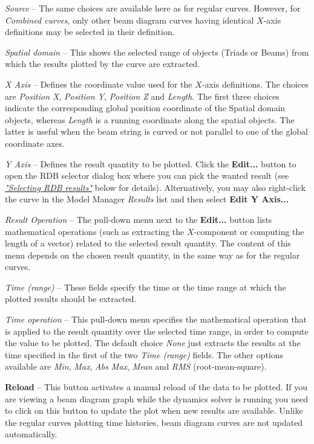 \begin{bulletlist}
\item{\sl Source} --
  The same choices are available here as for regular curves.
  However, for {\sl Combined curves}, only other beam diagram curves having
  identical $X$-axis definitions may be selected in their definition.

\item{\sl Spatial domain} --
  This shows the selected range of objects (Triads or Beams)
  from which the results plotted by the curve are extracted.

\item{\sl X Axis} --
  Defines the coordinate value used for the $X$-axis definitions.
  The choices are {\sl Position X}, {\sl Position Y}, {\sl Position Z} and
  {\sl Length}. The first three choices indicate the corresponding global
  position coordinate of the Spatial domain objects, whereas {\sl Length}
  is a running coordinate along the spatial objects.
  The latter is useful when the beam string is curved or not parallel to
  one of the global coordinate axes.

\item{\sl Y Axis} --
  Defines the result quantity to be plotted.
  Click the \textbf{Edit...} button to open the RDB selector dialog box
  where you can pick the wanted result (see
  \protect\hyperlink{selecting-beam-results}{\sl"Selecting RDB results"}
  below for details). Alternatively, you may also right-click the curve in the
  Model Manager {\sl Results} list and then select \textbf{Edit Y Axis...}

\item{\sl Result Operation} --
  The pull-down menu next to the \textbf{Edit...} button lists mathematical
  operations (such as extracting the $X$-component or computing the length of a
  vector) related to the selected result quantity. The content of this menu
  depends on the chosen result quantity, in the same way as for the regular
  curves.

\item{\sl Time (range)} --
  These fields specify the time or the time range at which the plotted results
  should be extracted.

\item{\sl Time operation} --
  This pull-down menu specifies the mathematical operation that is applied to
  the result quantity over the selected time range, in order to compute the
  value to be plotted. The default choice {\sl None} just extracts the results
  at the time specified in the first of the two {\sl Time (range)} fields.
  The other options available are {\sl Min}, {\sl Max}, {\sl Abs Max},
  {\sl Mean} and {\sl RMS} (root-mean-square).

\item\textbf{Reload} --
  This button activates a manual reload of the data to be plotted.
  If you are viewing a beam diagram graph while the dynamics solver is running
  you need to click on this button to update the plot when new results are
  available. Unlike the regular curves plotting time histories,
  beam diagram curves are not updated automatically.
\end{bulletlist}

